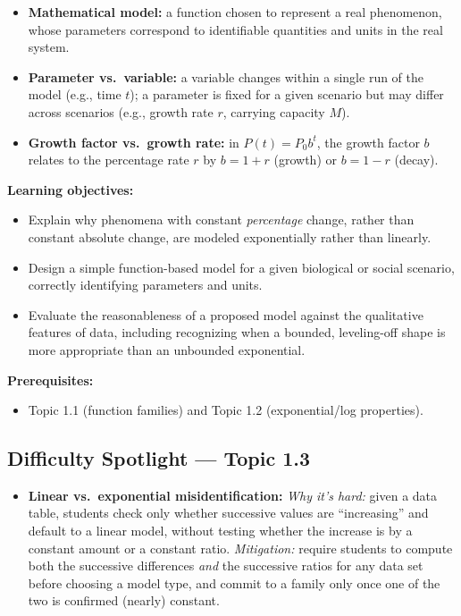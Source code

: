 \documentclass{article}
\begin{document}
\begin{keydefs}
\begin{itemize}[leftmargin=*]
  \item \textbf{Mathematical model:} a function chosen to represent a real phenomenon, whose parameters correspond to identifiable quantities and units in the real system.
  \item \textbf{Parameter vs.\ variable:} a variable changes within a single run of the model (e.g., time $t$); a parameter is fixed for a given scenario but may differ across scenarios (e.g., growth rate $r$, carrying capacity $M$).
  \item \textbf{Growth factor vs.\ growth rate:} in $P(t)=P_0b^t$, the growth factor $b$ relates to the percentage rate $r$ by $b=1+r$ (growth) or $b=1-r$ (decay).
\end{itemize}
\end{keydefs}

\textbf{Learning objectives:}
\begin{itemize}[leftmargin=*]
  \item Explain why phenomena with constant \emph{percentage} change, rather than constant absolute change, are modeled exponentially rather than linearly.
  \item Design a simple function-based model for a given biological or social scenario, correctly identifying parameters and units.
  \item Evaluate the reasonableness of a proposed model against the qualitative features of data, including recognizing when a bounded, leveling-off shape is more appropriate than an unbounded exponential.
\end{itemize}

\textbf{Prerequisites:}
\begin{itemize}[leftmargin=*]
  \item Topic 1.1 (function families) and Topic 1.2 (exponential/log properties).
\end{itemize}

\subsection*{Difficulty Spotlight --- Topic 1.3}
\begin{itemize}[leftmargin=*]
  \item \textbf{Linear vs.\ exponential misidentification:} \textit{Why it's hard:} given a data table, students check only whether successive values are ``increasing'' and default to a linear model, without testing whether the increase is by a constant amount or a constant ratio. \textit{Mitigation:} require students to compute both the successive differences \emph{and} the successive ratios for any data set before choosing a model type, and commit to a family only once one of the two is confirmed (nearly) constant.
\end{itemize}
\end{document}
